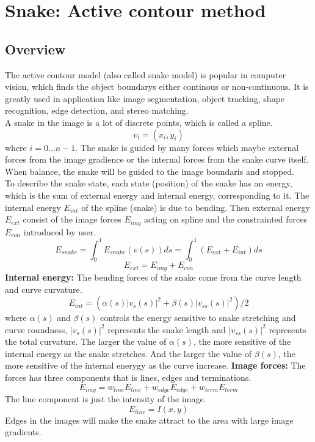 \section{Snake: Active contour method}
\subsection{Overview}
The active contour model\cite{kass1988snakes} (also called snake model) is popular in computer vision, which finds the object boundarys either continous or non-continuous. It is greatly used in application like image segmentation, object tracking, shape recognition, edge detection, and stereo matching.\\
A snake in the image is a lot of discrete points, which is called a spline.
$$
v_i = (x_i, y_i)
$$
where $i=0\ldots n-1$. The snake is guided by many forces which maybe external forces from the image gradience or the internal forces from the snake curve itself. When balance, the snake will be guided to the image boundaris and stopped.\\
To describe the snake state, each state (position) of the snake has an energy, which is the sum of external energy and internal energy, corresponding to it. The internal energy $E_{int}$ of the spline (snake) is due to bending. Then external energy $E_{ext}$ consist of the image forces $E_{img}$ acting on spline and the constrainted forces $E_{con}$ introduced by user. \\
$$
E_{snake} = \int_0^1E_{snake}(v(s))ds = \int_0^1(E_{ext} + E_{int})ds
$$
$$
E_{ext} = E_{img} + E_{con}
$$
\textbf{Internal energy: } The bending forces of the snake come from the curve length and curve curvature.
\begin{equation}\label{eqn:int-energy}
E_{int} = (\alpha(s)|v_s(s)|^2 + \beta(s)|v_{ss}(s)|^2)/2
\end{equation}
where $\alpha(s)$ and $\beta(s)$ controls the energy sensitive to snake stretching and curve roundness, $|v_s(s)|^2$ represents the snake length and $|v_{ss}(s)|^2$ represents the total curvature. The larger the value of $\alpha(s)$, the more sensitive of the internal energy as the snake stretches. And the larger the value of $\beta(s)$, the more sensitive of the internal enerygy as the curve increase.
\textbf{Image forces: } The forces has three components that is lines, edges and terminations.
$$
E_{img} = w_{line}E_{line} + w_{edge}E_{edge} + w_{term}E_{term}
$$
The line component is just the intensity of the image.
$$
E_{line} = I(x,y)
$$
Edges in the images will make the snake attract to the area with large image gradients.
